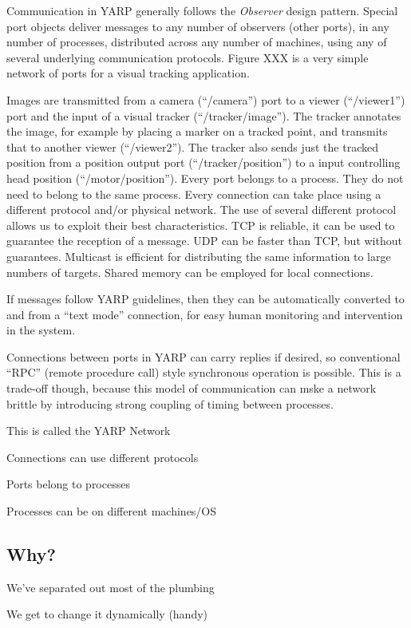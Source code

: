 Communication in YARP generally follows the {\it Observer} design
pattern. Special port objects deliver messages to any number of
observers (other ports), in any number of processes, distributed
across any number of machines, using any of several underlying
communication protocols. Figure XXX is a very simple network of ports
for a visual tracking application.

Images are transmitted from a camera (``/camera'') port to a viewer
(``/viewer1'') port and the input of a visual tracker
(``/tracker/image''). The tracker annotates the image, for example by
placing a marker on a tracked point, and transmits that to another
viewer (``/viewer2''). The tracker also sends just the tracked position
from a position output port (``/tracker/position'') to a input
controlling head position (``/motor/position''). Every port belongs to a
process. They do not need to belong to the same process. Every
connection can take place using a different protocol and/or physical
network. The use of several different protocol allows us to exploit
their best characteristics.
TCP is reliable, it can be used to guarantee the reception of a message.
UDP can be faster than TCP, but without guarantees.
Multicast is efficient for distributing the same information to large
numbers of targets.
Shared memory can be employed for local connections.

If messages follow YARP guidelines, then they can be
automatically converted to and from a ``text mode'' connection, for easy
human monitoring and intervention in the system.

Connections between ports in YARP can carry replies if desired,
so conventional ``RPC'' (remote procedure call) style synchronous
operation is possible.  This is a trade-off though, because this
model of communication can mske a network brittle by introducing
strong coupling of timing between processes.

This is called the YARP Network

Connections can use different protocols

Ports belong to processes

Processes can be on different machines/OS

\subsection*{Why?}

We've separated out most of the plumbing

We get to change it dynamically (handy)

